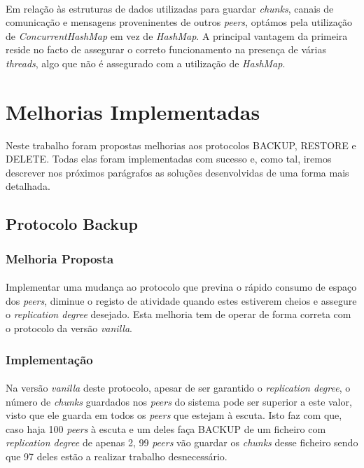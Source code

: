 \documentclass[11pt,oneside]{book}
\begin{document}
\paragraph{}
    Em relação às estruturas de dados utilizadas para guardar \textit{chunks},
    canais de comunicação e  
    mensagens proveninentes de outros \textit{peers}, optámos pela utilização de
    \textit{ConcurrentHashMap} em vez de \textit{HashMap}. A principal vantagem da
    primeira reside no facto de assegurar o correto funcionamento na presença de 
    várias \textit{threads}, algo que não é assegurado com a utilização de 
    \textit{HashMap}.
\pagebreak

\section{Melhorias Implementadas}
    Neste trabalho foram propostas melhorias aos protocolos BACKUP, RESTORE e 
    DELETE. Todas elas foram implementadas com sucesso e, como tal, iremos descrever
    nos próximos parágrafos as soluções desenvolvidas de uma forma mais detalhada. 

\subsection{Protocolo Backup}

\subsubsection{Melhoria Proposta}
\paragraph{}
Implementar uma mudança ao protocolo que previna o rápido consumo de espaço dos 
\textit{peers}, diminue o registo de atividade quando estes estiverem cheios e 
assegure o \textit{replication degree} desejado. Esta melhoria tem de operar
de forma correta com o protocolo da versão \textit{vanilla}.

\subsubsection{Implementação}
\paragraph{}
    Na versão \textit{vanilla} deste protocolo, apesar de ser garantido o 
    \textit{replication degree}, o número de \textit{chunks} guardados nos 
    \textit{peers} do sistema pode ser superior a este valor, visto que ele
    guarda em todos os \textit{peers} que estejam à escuta. Isto faz com que, 
    caso haja 100 \textit{peers} à escuta e um deles faça BACKUP de um ficheiro
    com \textit{replication degree} de apenas 2, 99 \textit{peers} vão guardar os 
    \textit{chunks} desse ficheiro sendo que 97 deles estão a realizar
    trabalho desnecessário.
\end{document}
